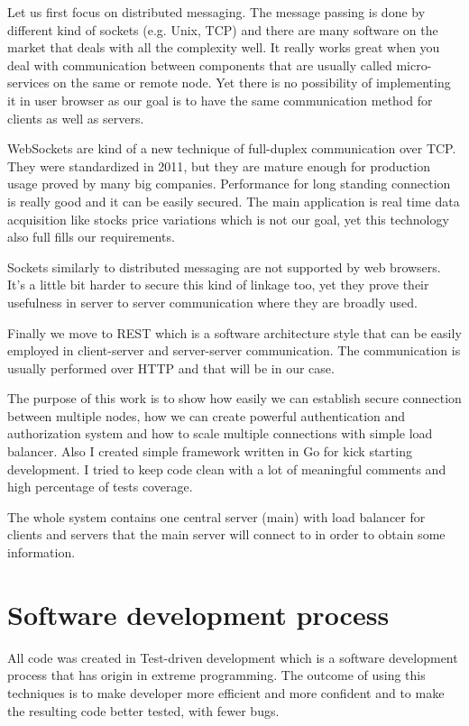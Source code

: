 Let us first focus on distributed messaging. The message passing is done by different kind of sockets (e.g. Unix, TCP) and there are many software on the market that deals with all the complexity well. It really works great when you deal with communication between components that are usually called micro-services on the same or remote node. Yet there is no possibility of implementing it in user browser as our goal is to have the same communication method for clients as well as servers.

WebSockets are kind of a new technique of full-duplex communication over TCP\@. They were standardized in 2011\cite{WebSockets-wiki}, but they are mature enough for production usage proved by many big companies. Performance for long standing connection is really good and it can be easily secured. The main application is real time data acquisition like stocks price variations which is not our goal, yet this technology also full fills our requirements.

Sockets similarly to distributed messaging are not supported by web browsers. It's a little bit harder to secure this kind of linkage too, yet they prove their usefulness in server to server communication where they are broadly used.

Finally we move to REST which is a software architecture style that can be easily employed in client-server and server-server communication. The communication is usually performed over HTTP and that will be in our case.

The purpose of this work is to show how easily we can establish secure connection between multiple nodes, how we can create powerful authentication and authorization system and how to scale multiple connections with simple load balancer. Also I created simple framework written in Go for kick starting development. I tried to keep code clean with a lot of meaningful comments and high percentage of tests coverage.

The whole system contains one central server (main) with load balancer for clients and servers that the main server will connect to in order to obtain some information.


\section{Software development process}
All code was created in Test-driven development which is a software development process\cite{TDD} that has origin in extreme programming. The outcome of using this techniques is to make developer more efficient and more confident and to make the resulting code better tested, with fewer bugs.

